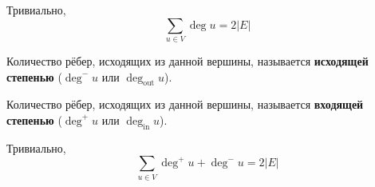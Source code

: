 \documentclass{article}
\begin{document}
    \begin{lemma}
        Тривиально,
        $$
        \sum\limits_{u\in V}\deg u=2|E|
        $$
    \end{lemma}
    \begin{definition}
        Количество рёбер, исходящих из данной вершины, называется \textbf{исходящей степенью} ($\deg^-u$ или $\deg_{\mathrm{out}}u$).
    \end{definition}
    \begin{definition}
        Количество рёбер, исходящих из данной вершины, называется \textbf{входящей степенью} ($\deg^+u$ или $\deg_{\mathrm{in}}u$).
    \end{definition}
    \begin{lemma}
        Тривиально,
        $$
        \sum\limits_{u\in V}\deg^+u+\deg^-u=2|E|
        $$
    \end{lemma}
\end{document}
